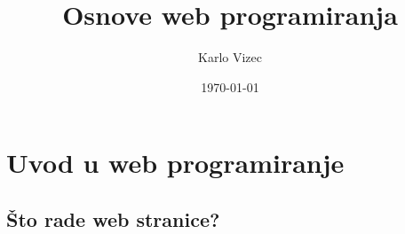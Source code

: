 \documentclass{report}
\title{\Huge{Osnove web programiranja}}
\author{\huge{Karlo Vizec}}
\date{\today}
\begin{document}
    \maketitle
    \newpage%
    \tableofcontents
    \pagebreak

    \chapter{Uvod u web programiranje}
        \lipsum
        \section{Što rade web stranice?}
            \lipsum
\end{document}
